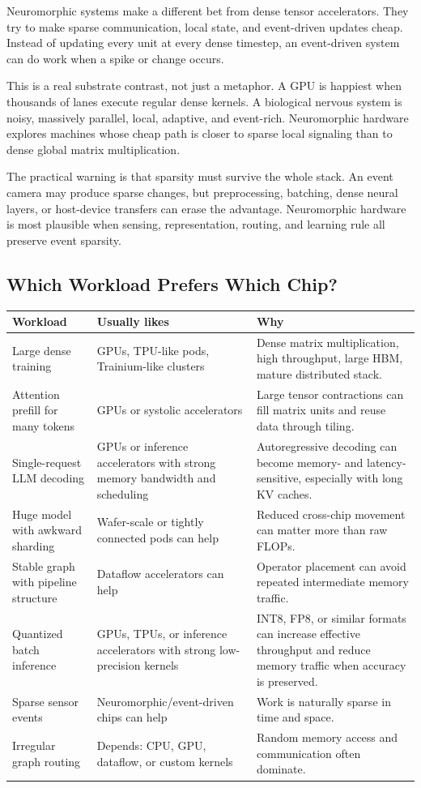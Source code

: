 Neuromorphic systems make a different bet from dense tensor accelerators. They try to make sparse communication, local state, and event-driven updates cheap. Instead of updating every unit at every dense timestep, an event-driven system can do work when a spike or change occurs.

This is a real substrate contrast, not just a metaphor. A GPU is happiest when thousands of lanes execute regular dense kernels. A biological nervous system is noisy, massively parallel, local, adaptive, and event-rich. Neuromorphic hardware explores machines whose cheap path is closer to sparse local signaling than to dense global matrix multiplication.

The practical warning is that sparsity must survive the whole stack. An event camera may produce sparse changes, but preprocessing, batching, dense neural layers, or host-device transfers can erase the advantage. Neuromorphic hardware is most plausible when sensing, representation, routing, and learning rule all preserve event sparsity.

\subsection{Which Workload Prefers Which Chip?}

\begin{longtable}{@{}p{}p{}p{}@{}}
\toprule
Workload & Usually likes & Why \\
\midrule
Large dense training & GPUs, TPU-like pods, Trainium-like clusters & Dense matrix multiplication, high throughput, large HBM, mature distributed stack. \\
Attention prefill for many tokens & GPUs or systolic accelerators & Large tensor contractions can fill matrix units and reuse data through tiling. \\
Single-request LLM decoding & GPUs or inference accelerators with strong memory bandwidth and scheduling & Autoregressive decoding can become memory- and latency-sensitive, especially with long KV caches. \\
Huge model with awkward sharding & Wafer-scale or tightly connected pods can help & Reduced cross-chip movement can matter more than raw FLOPs. \\
Stable graph with pipeline structure & Dataflow accelerators can help & Operator placement can avoid repeated intermediate memory traffic. \\
Quantized batch inference & GPUs, TPUs, or inference accelerators with strong low-precision kernels & INT8, FP8, or similar formats can increase effective throughput and reduce memory traffic when accuracy is preserved. \\
Sparse sensor events & Neuromorphic/event-driven chips can help & Work is naturally sparse in time and space. \\
Irregular graph routing & Depends: CPU, GPU, dataflow, or custom kernels & Random memory access and communication often dominate. \\
\bottomrule
\end{longtable}

